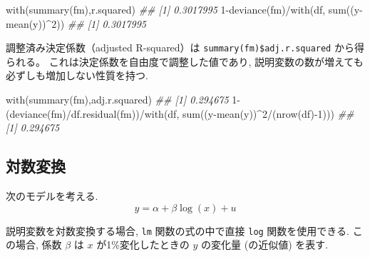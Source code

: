 \documentclass[
  letterpaper,
  xelatex,
  ja=standard, xelatex]{bxjsbook}
\newenvironment{Shaded}{\begin{snugshade}}{\end{snugshade}}
\newcommand{\DecValTok}[1]{\textcolor[rgb]{0.68,0.00,0.00}{#1}}
\newcommand{\DocumentationTok}[1]{\textcolor[rgb]{0.37,0.37,0.37}{\textit{#1}}}
\newcommand{\FunctionTok}[1]{\textcolor[rgb]{0.28,0.35,0.67}{#1}}
\newcommand{\NormalTok}[1]{\textcolor[rgb]{0.00,0.23,0.31}{#1}}
\newcommand{\SpecialCharTok}[1]{\textcolor[rgb]{0.37,0.37,0.37}{#1}}
\begin{document}
\begin{Shaded}
\begin{Highlighting}[]
\FunctionTok{with}\NormalTok{(}\FunctionTok{summary}\NormalTok{(fm),r.squared)}
\DocumentationTok{\#\# [1] 0.3017995}
\DecValTok{1}\SpecialCharTok{{-}}\FunctionTok{deviance}\NormalTok{(fm)}\SpecialCharTok{/}\FunctionTok{with}\NormalTok{(df, }\FunctionTok{sum}\NormalTok{((y}\SpecialCharTok{{-}}\FunctionTok{mean}\NormalTok{(y))}\SpecialCharTok{\^{}}\DecValTok{2}\NormalTok{))}
\DocumentationTok{\#\# [1] 0.3017995}
\end{Highlighting}
\end{Shaded}

調整済み決定係数（adjusted R-squared）は
\texttt{summary(fm)\$adj.r.squared} から得られる。
これは決定係数を自由度で調整した値であり,
説明変数の数が増えても必ずしも増加しない性質を持つ.

\begin{Shaded}
\begin{Highlighting}[]
\FunctionTok{with}\NormalTok{(}\FunctionTok{summary}\NormalTok{(fm),adj.r.squared)}
\DocumentationTok{\#\# [1] 0.294675}
\DecValTok{1}\SpecialCharTok{{-}}\NormalTok{(}\FunctionTok{deviance}\NormalTok{(fm)}\SpecialCharTok{/}\FunctionTok{df.residual}\NormalTok{(fm))}\SpecialCharTok{/}\FunctionTok{with}\NormalTok{(df, }\FunctionTok{sum}\NormalTok{((y}\SpecialCharTok{{-}}\FunctionTok{mean}\NormalTok{(y))}\SpecialCharTok{\^{}}\DecValTok{2}\SpecialCharTok{/}\NormalTok{(}\FunctionTok{nrow}\NormalTok{(df)}\SpecialCharTok{{-}}\DecValTok{1}\NormalTok{)))}
\DocumentationTok{\#\# [1] 0.294675}
\end{Highlighting}
\end{Shaded}

\subsection{対数変換}\label{ux5bfeux6570ux5909ux63db}

次のモデルを考える. \[
y = \alpha + \beta \log(x) + u
\]

説明変数を対数変換する場合, \texttt{lm} 関数の式の中で直接 \texttt{log}
関数を使用できる. この場合, 係数 \(\beta\) は \(x\) が1\%変化したときの
\(y\) の変化量 (の近似値) を表す.
\end{document}
